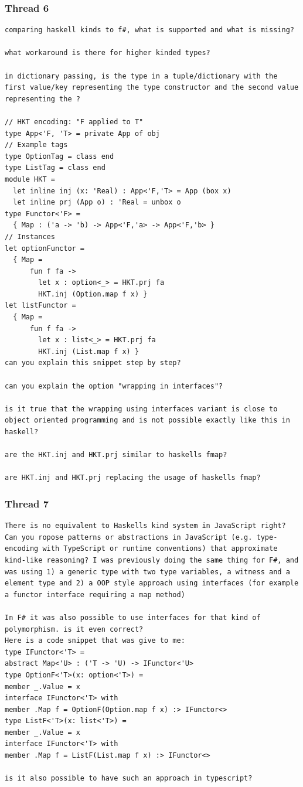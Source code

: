 \documentclass[12pt,oneside,a4paper]{article}
\begin{document}
\subsubsection*{Thread 6}
\begin{lstlisting}
comparing haskell kinds to f#, what is supported and what is missing?

what workaround is there for higher kinded types?

in dictionary passing, is the type in a tuple/dictionary with the first value/key representing the type constructor and the second value representing the ?

// HKT encoding: "F applied to T"
type App<'F, 'T> = private App of obj
// Example tags
type OptionTag = class end
type ListTag = class end
module HKT =
  let inline inj (x: 'Real) : App<'F,'T> = App (box x)
  let inline prj (App o) : 'Real = unbox o
type Functor<'F> =
  { Map : ('a -> 'b) -> App<'F,'a> -> App<'F,'b> }
// Instances
let optionFunctor =
  { Map =
      fun f fa ->
        let x : option<_> = HKT.prj fa
        HKT.inj (Option.map f x) }
let listFunctor =
  { Map =
      fun f fa ->
        let x : list<_> = HKT.prj fa
        HKT.inj (List.map f x) }
can you explain this snippet step by step?

can you explain the option "wrapping in interfaces"?

is it true that the wrapping using interfaces variant is close to object oriented programming and is not possible exactly like this in haskell?

are the HKT.inj and HKT.prj similar to haskells fmap?

are HKT.inj and HKT.prj replacing the usage of haskells fmap?
\end{lstlisting}
\subsubsection*{Thread 7}
\begin{lstlisting}
There is no equivalent to Haskells kind system in JavaScript right? Can you ropose patterns or abstractions in JavaScript (e.g. type-encoding with TypeScript or runtime conventions) that approximate kind-like reasoning? I was previously doing the same thing for F#, and was using 1) a generic type with two type variables, a witness and a element type and 2) a OOP style approach using interfaces (for example a functor interface requiring a map method)

In F# it was also possible to use interfaces for that kind of polymorphism. is it even correct?
Here is a code snippet that was give to me:
type IFunctor<'T> =
abstract Map<'U> : ('T -> 'U) -> IFunctor<'U>
type OptionF<'T>(x: option<'T>) =
member _.Value = x
interface IFunctor<'T> with
member .Map f = OptionF(Option.map f x) :> IFunctor<>
type ListF<'T>(x: list<'T>) =
member _.Value = x
interface IFunctor<'T> with
member .Map f = ListF(List.map f x) :> IFunctor<>

is it also possible to have such an approach in typescript?
\end{lstlisting}
\end{document}
